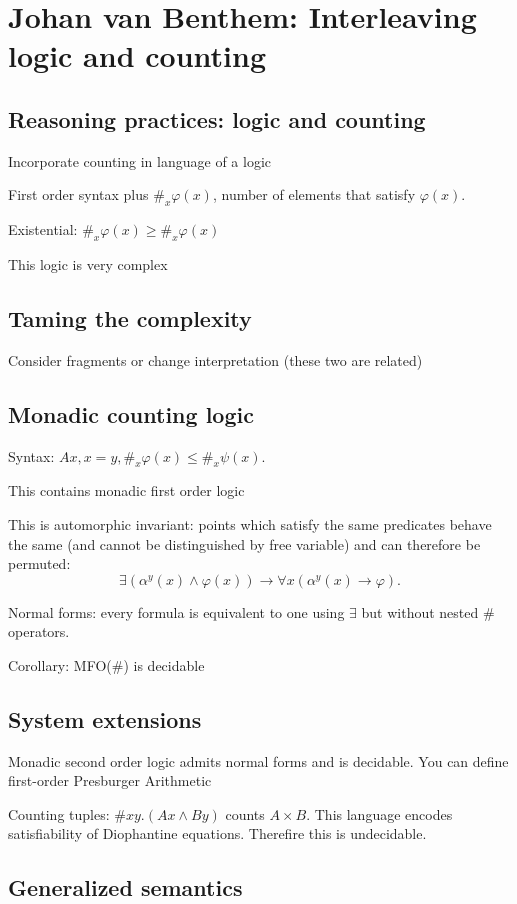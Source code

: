 \section{Johan van Benthem: Interleaving logic and counting}

\subsection{Reasoning practices: logic and counting}
Incorporate counting in language of a logic

First order syntax plus \(\#_{x}\varphi(x)\), number of elements that satisfy
\(\varphi(x)\).

Existential: \(\#_{x}\varphi(x)\geq\#_{x}\varphi(x)\)

This logic is very complex

\subsection{Taming the complexity}
Consider fragments or change interpretation (these two are related)

\subsection{Monadic counting logic}
Syntax: \(Ax,x=y,\#_{x}\varphi(x)\leq\#_{x}\psi(x)\).

This contains monadic first order logic

This is automorphic invariant: points which satisfy the same predicates behave
the same (and cannot be distinguished by free variable) and can therefore be
permuted:
\[
    \exists(\alpha^{y}(x)\wedge\varphi(x))\to\forall x(\alpha^{y}(x)\to\varphi).
\]

Normal forms: every formula is equivalent to one using \(\exists\) but without
nested \(\#\) operators.

Corollary: MFO(\(\#\)) is decidable

\subsection{System extensions}
Monadic second order logic admits normal forms and is decidable.
You can define first-order Presburger Arithmetic

Counting tuples: \(\#xy.(Ax\wedge By)\) counts \(A\times B\). This language
encodes satisfiability of Diophantine equations. Therefire this is undecidable.

\subsection{Generalized semantics}